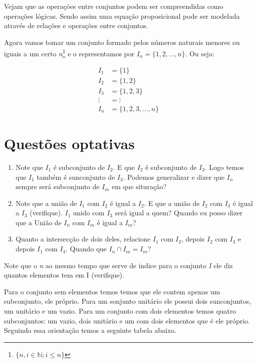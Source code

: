 Vejam que as operações entre conjuntos podem ser compreendidas como operações lógicas. Sendo assim uma equação proposicional pode ser modelada através de relações e operações entre conjuntos.



Agora vamos tomar um conjunto formado pelos números naturais menores ou iguais a um certo \textit{n}\footnote{$\{n,i\in \mathbb{N}; i\leq n\}$} e o representamos por $I_n=\{1,2, \dots, n\}$. Ou seja:

\begin{align*}
    I_1&=\{1\}\\
    I_2&=\{1,2\}\\
    I_3&=\{1,2,3\}\\
    \vdots &= \vdots \\
    I_n&=\{1,2,3, \dots , n\}
\end{align*}

\section*{Questões optativas}
\begin{enumerate}
\item Note que $I_1$ é subconjunto de $I_2$. E que $I_2$ é subconjunto de $I_3$. Logo temos que $I_1$ também é sunconjunto de $I_3$. Podemos generalizar e dizer que $I_n$ sempre será subconjunto de $I_m$ em que situração?

\item Note que a união de $I_1$ com $I_2$ é igual a $I_2$. E que a união de $I_2$ com $I_3$ é igual a $I_3$ (verifique). $I_1$ unido com $I_3$ será igual a quem? Quando eu posso dizer que a União de $I_n$ com $I_m$ é igual a $I_m$?

\item Quanto a intersecção de dois deles, relacione $I_1$ com $I_2$, depois $I_2$ com $I_3$ e depois $I_1$ com $I_3$. Quando que $I_n \cap I_m = I_m$?
\end{enumerate}

Note que o \textit{n} ao mesmo tempo que serve de indice para o conjunto \textit{I} ele diz quantos elementos tem em I (verifique).


Para o conjunto sem elementos temos temos que ele contem apenas um subconjunto, ele próprio. Para um sonjunto unitário ele possui dois sunconjuntos, um unitário e um vazio. Para um conjunto com dois elementos temos quatro subconjuntos: um vazio, dois unitário e um com dois elementos que é ele próprio. Seguindo essa orientação temos a seguinte tabela abaixo.\\

